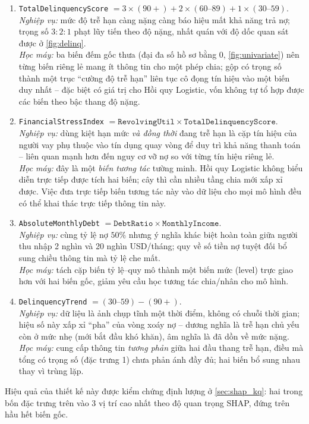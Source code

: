 \documentclass[12pt,a4paper,oneside]{report}
\theoremstyle{vnplain}
\theoremstyle{vndef}
\begin{document}
\begin{enumerate}
  \item \texttt{TotalDelinquencyScore} $=3\times(90{+})+2\times(60\text{--}89)+1\times(30\text{--}59)$.\\
        \emph{Nghiệp vụ:} mức độ trễ hạn càng nặng càng báo hiệu mất khả năng trả nợ;
        trọng số $3{:}2{:}1$ phạt lũy tiến theo độ nặng, nhất quán với độ dốc quan sát
        được ở \cref{fig:delinq}.\\
        \emph{Học máy:} ba biến đếm gốc thưa (đại đa số hồ sơ bằng 0,
        \cref{fig:univariate}) nên từng biến riêng lẻ mang ít thông tin cho một phép
        chia; gộp có trọng số thành một trục ``cường độ trễ hạn'' liên tục cô đọng tín
        hiệu vào một biến duy nhất -- đặc biệt có giá trị cho Hồi quy Logistic, vốn
        không tự tổ hợp được các biến theo bậc thang độ nặng.
  \item \texttt{FinancialStressIndex} $=\texttt{RevolvingUtil}\times\texttt{TotalDelinquencyScore}$.\\
        \emph{Nghiệp vụ:} dùng kiệt hạn mức \emph{và đồng thời} đang trễ hạn là cặp tín
        hiệu của người vay phụ thuộc vào tín dụng quay vòng để duy trì khả năng thanh toán -- liên quan mạnh hơn đến nguy cơ vỡ nợ so với từng tín
        hiệu riêng lẻ.\\
        \emph{Học máy:} đây là một \emph{biến tương tác} tường minh. Hồi quy Logistic
        không biểu diễn trực tiếp được tích hai biến; cây thì cần nhiều tầng chia mới xấp
        xỉ được. Việc đưa trực tiếp biến tương tác này vào dữ liệu cho mọi mô hình đều có thể khai thác trực tiếp thông tin này.
  \item \texttt{AbsoluteMonthlyDebt} $=\texttt{DebtRatio}\times\texttt{MonthlyIncome}$.\\
        \emph{Nghiệp vụ:} cùng tỷ lệ nợ $50\%$ nhưng ý nghĩa khác biệt hoàn toàn giữa người thu
        nhập 2 nghìn và 20 nghìn USD/tháng; quy về số tiền nợ tuyệt đối bổ sung chiều
        thông tin mà tỷ lệ che mất.\\
        \emph{Học máy:} tách cặp biến tỷ lệ--quy mô thành một biến mức (level) trực
        giao hơn với hai biến gốc, giảm yêu cầu học tương tác chia/nhân cho mô hình.
  \item \texttt{DelinquencyTrend} $=(30\text{--}59)-(90{+})$.\\
        \emph{Nghiệp vụ:} dữ liệu là ảnh chụp tĩnh một thời điểm, không có chuỗi thời
        gian; hiệu số này xấp xỉ ``pha'' của vòng xoáy nợ -- dương nghĩa là trễ hạn chủ
        yếu còn ở mức nhẹ (mới bắt đầu khó khăn), âm nghĩa là đã dồn về mức nặng.\\
        \emph{Học máy:} cung cấp thông tin \emph{tương phản} giữa hai đầu thang trễ hạn,
        điều mà tổng có trọng số (đặc trưng 1) chưa phản ánh đầy đủ; hai biến bổ sung nhau thay
        vì trùng lặp.
\end{enumerate}
Hiệu quả của thiết kế này được kiểm chứng định lượng ở \cref{sec:shap_kq}: hai trong bốn
đặc trưng trên vào 3 vị trí cao nhất theo độ quan trọng SHAP, đứng trên hầu hết biến gốc.
\end{document}
